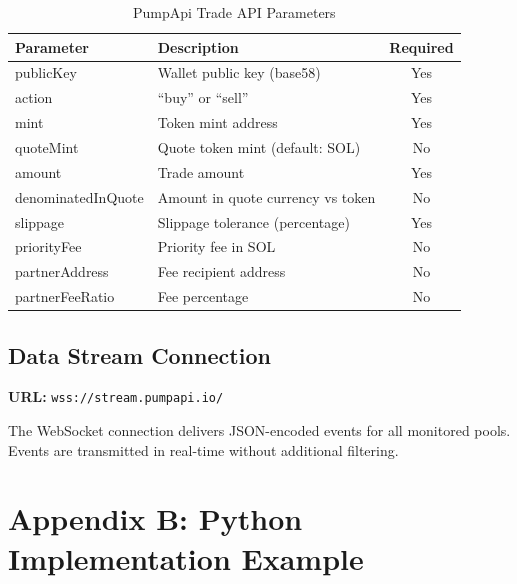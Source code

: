 \documentclass[12pt,a4paper]{article}
\begin{document}
\begin{table}[htbp]
\centering
\caption{PumpApi Trade API Parameters}
\label{tab:api-params}
\begin{tabular}{@{}lp{8cm}c@{}}
\toprule
Parameter & Description & Required \\
\midrule
publicKey & Wallet public key (base58) & Yes \\
action & ``buy'' or ``sell'' & Yes \\
mint & Token mint address & Yes \\
quoteMint & Quote token mint (default: SOL) & No \\
amount & Trade amount & Yes \\
denominatedInQuote & Amount in quote currency vs token & No \\
slippage & Slippage tolerance (percentage) & Yes \\
priorityFee & Priority fee in SOL & No \\
partnerAddress & Fee recipient address & No \\
partnerFeeRatio & Fee percentage & No \\
\bottomrule
\end{tabular}
\end{table}

\subsection*{Data Stream Connection}

\textbf{URL:} \texttt{wss://stream.pumpapi.io/}

The WebSocket connection delivers JSON-encoded events for all monitored pools. Events are transmitted in real-time without additional filtering.

\section*{Appendix B: Python Implementation Example}
\end{document}

